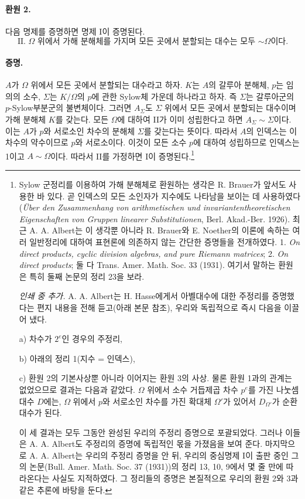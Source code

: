\paragraph{환원 2.}
다음 명제를 증명하면 명제 I이 증명된다.
\[
\text{II. \(\Omega\) 위에서 가해 분해체를 가지며 모든 곳에서 분할되는 대수는 모두 \(\sim\Omega\)이다.}
\]

\paragraph{증명.}
\(A\)가 \(\Omega\) 위에서 모든 곳에서 분할되는 대수라고 하자. \(K\)는 \(A\)의 갈루아 분해체, \(p\)는 임의의 소수, \(\Sigma\)는 \(K/\Omega\)의 \(p\)에 관한 Sylow체 가운데 하나라고 하자. 즉 \(\Sigma\)는 갈루아군의 \(p\)-Sylow부분군의 불변체이다. 그러면 \(A_\Sigma\)도 \(\Sigma\) 위에서 모든 곳에서 분할되는 대수이며 가해 분해체 \(K\)를 갖는다. 모든 \(\Omega\)에 대하여 II가 이미 성립한다고 하면 \(A_\Sigma\sim\Sigma\)이다. 이는 \(A\)가 \(p\)와 서로소인 차수의 분해체 \(\Sigma\)를 갖는다는 뜻이다. 따라서 \(A\)의 인덱스는 이 차수의 약수이므로 \(p\)와 서로소이다. 이것이 모든 소수 \(p\)에 대하여 성립하므로 인덱스는 1이고 \(A\sim\Omega\)이다. 따라서 II를 가정하면 I이 증명된다.\footnote{Sylow 군정리를 이용하여 가해 분해체로 환원하는 생각은 R. Brauer가 앞서도 사용한 바 있다. 곧 인덱스의 모든 소인자가 지수에도 나타남을 보이는 데 사용하였다(\emph{Über den Zusammenhang von arithmetischen und invariantentheoretischen Eigenschaften von Gruppen linearer Substitutionen}, Berl. Akad.-Ber. 1926). 최근 A. A. Albert는 이 생각뿐 아니라 R. Brauer와 E. Noether의 이론에 속하는 여러 일반정리에 대하여 표현론에 의존하지 않는 간단한 증명들을 전개하였다. 1. \emph{On direct products, cyclic division algebras, and pure Riemann matrices}; 2. \emph{On direct products}; 둘 다 Trans. Amer. Math. Soc. 33 (1931). 여기서 말하는 환원은 특히 둘째 논문의 정리 23을 보라.

\emph{인쇄 중 추가.} A. A. Albert는 H. Hasse에게서 아벨대수에 대한 주정리를 증명했다는 편지 내용을 전해 듣고(아래 본문 참조), 우리와 독립적으로 즉시 다음을 이끌어 냈다.

a) 차수가 \(2^e\)인 경우의 주정리,

b) 아래의 정리 1(지수 = 인덱스),

c) 환원 2의 기본사상뿐 아니라 이어지는 환원 3의 사상. 물론 환원 1과의 관계는 없었으므로 결과는 다음과 같았다. \(\Omega\) 위에서 소수 거듭제곱 차수 \(p^e\)를 가진 나눗셈대수 \(D\)에는, \(\Omega\) 위에서 \(p\)와 서로소인 차수를 가진 확대체 \(\Omega'\)가 있어서 \(D_{\Omega'}\)가 순환대수가 된다.

이 세 결과는 모두 그동안 완성된 우리의 주정리 증명으로 포괄되었다. 그러나 이들은 A. A. Albert도 주정리의 증명에 독립적인 몫을 가졌음을 보여 준다. 마지막으로 A. A. Albert는 우리의 주정리 증명을 안 뒤, 우리의 중심명제 I이 출판 중인 그의 논문(Bull. Amer. Math. Soc. 37 (1931))의 정리 13, 10, 9에서 몇 줄 만에 따라온다는 사실도 지적하였다. 그 정리들의 증명은 본질적으로 우리의 환원 2와 3과 같은 추론에 바탕을 둔다.}

